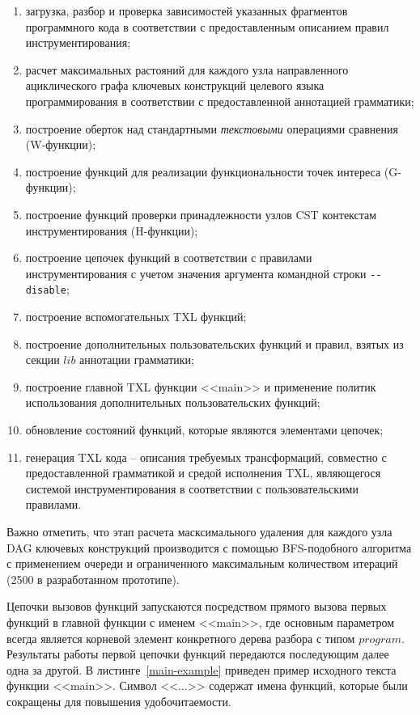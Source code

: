 \begin{enumerate}[noitemsep]
  \item загрузка, разбор и проверка зависимостей указанных фрагментов программного кода в соответствии с предоставленным описанием правил инструментирования;
  \item расчет максимальных растояний для каждого узла направленного ациклического графа ключевых конструкций целевого языка программирования в соответствии с предоставленной аннотацией грамматики;
  \item построение оберток над стандартными \textit{текстовыми} операциями сравнения (W-функции);
  \item построение функций для реализации функциональности точек интереса (G-функции);
  \item построение функций проверки принадлежности узлов CST контекстам инструментирования (H-функции);
  \item построение цепочек функций в соответствии с правилами инструментирования с учетом значения аргумента командной строки \lstinline{--disable};
  \item построение вспомогательных TXL функций;
  \item построение дополнительных пользовательских функций и правил, взятых из секции $lib$ аннотации грамматики;
  \item построение главной TXL функции <<main>> и применение политик использования дополнительных пользовательских функций;
  \item обновление состояний функций, которые являются элементами цепочек;
  \item генерация TXL кода -- описания требуемых трансформаций, совместно с предоставленной грамматикой и средой исполнения TXL, являющегося системой инструментирования в соответствии с пользовательскими правилами.
\end{enumerate}

Важно отметить, что этап расчета масксимального удаления для каждого узла DAG ключевых конструкций производится с помощью BFS-подобного алгоритма с применением очереди и ограниченного максимальным количеством итераций (2500 в разработанном прототипе).

Цепочки вызовов функций запускаются посредством прямого вызова первых функций в главной функции с именем <<main>>, где  основным параметром всегда является корневой элемент конкретного дерева разбора с типом $program$.
Результаты работы первой цепочки функций передаются последующим далее одна за другой.
В листинге~\ref{main-example} приведен пример исходного текста функции <<main>>.
Символ <<...>> содержат имена функций, которые были сокращены для повышения удобочитаемости.

